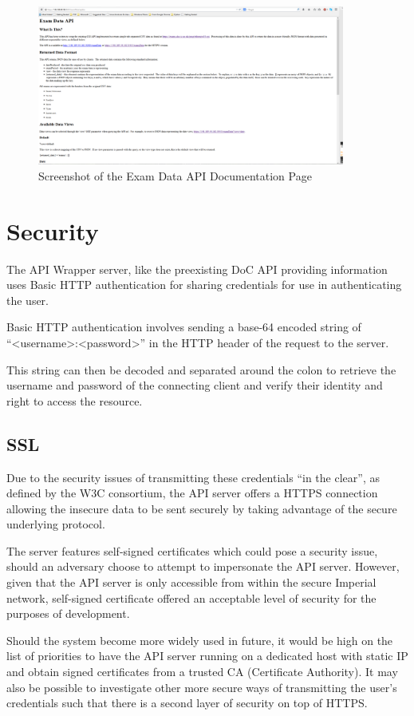 \begin{figure}[!htbp]
	\centering
	\includegraphics[width=0.9\textwidth]{"screenshots/Exam Data API"}
	\caption{Screenshot of the Exam Data API Documentation Page}
	\label{fig:exam_data_apidoc}
\end{figure}

\FloatBarrier

\section{Security}
\label{sec:security_wrapper}

The API Wrapper server, like the preexisting DoC API providing information uses Basic HTTP authentication for sharing credentials for use in authenticating the user.

Basic HTTP authentication involves sending a base-64 encoded string of ``\textless username\textgreater :\textless password\textgreater'' in the HTTP header of the request to the server.\cite{basicAuth}

This string can then be decoded and separated around the colon to retrieve the username and password of the connecting client and verify their identity and right to access the resource.

\subsection{SSL}

Due to the security issues of transmitting these credentials ``in the clear'', as defined by the W3C consortium\cite{intheclear}, the API server offers a HTTPS connection allowing the insecure data to be sent securely by taking advantage of the secure underlying protocol.

The server features self-signed certificates which could pose a security issue, should an adversary choose to attempt to impersonate the API server.  However, given that the API server is only accessible from within the secure Imperial network, self-signed certificate offered an acceptable level of security for the purposes of development.

Should the system become more widely used in future, it would be high on the list of priorities to have the API server running on a dedicated host with static IP and obtain signed certificates from a trusted CA (Certificate Authority).  It may also be possible to investigate other more secure ways of transmitting the user's credentials such that there is a second layer of security on top of HTTPS.
